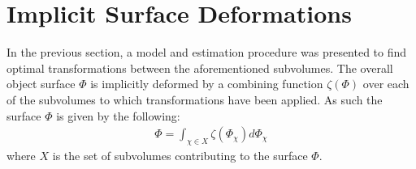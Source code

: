 \section{Implicit Surface Deformations}
In the previous section, a model and estimation procedure was presented to find optimal transformations between the aforementioned subvolumes.
The overall object surface $\Phi$ is implicitly deformed by a combining function $\zeta(\Phi)$ over each of the subvolumes to which transformations have been applied.
As such the surface $\Phi$ is given by the following:
\begin{equation}
\begin{split}
\Phi = \int_{\chi \in X} \zeta(\Phi_{\chi}) d \Phi_{\chi}
\end{split}
\end{equation}
where $X$ is the set of subvolumes contributing to the surface $\Phi$.

